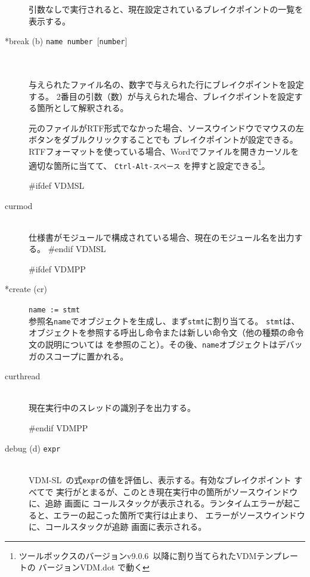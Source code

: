 \documentclass[\pformat,12pt]{article}
\newcommand{\vdmslpp}{VDM-SL}
\newcommand{\vdmslpp}{VDM++}
\newcommand{\vdmtoolsver}{v9.0.6}
\newcommand{\guicmd}[1]{{\sf #1}}
\newcommand{\guicmd}[1]{{\gt #1}}
\begin{document}
\begin{description}
  引数なしで実行されると、現在設定されているブレイクポイントの一覧を表示する。

\item[*break (b) \mbox{\texttt{name number} [\texttt{number}]}]\mbox{}\\
\mbox{}\\
 与えられたファイル名の、数字で与えられた行にブレイクポイントを設定する。
 2番目の引数（数）が与えられた場合、ブレイクポイントを設定する箇所として解釈される。

元のファイルがRTF形式でなかった場合、\guicmd{ソースウインドウ}でマウスの左ボタンをダブルクリックすることでも
ブレイクポイントが設定できる。
RTFフォーマットを使っている場合、Wordでファイルを開きカーソルを適切な箇所に当てて、
\texttt{Ctrl-Alt-スペース}%
を押すと設定できる\footnote{ツールボックスのバージョン\vdmtoolsver\ 以降に割り当てられたVDMテンプレートの
バージョンVDM.dot で動く}。 

#ifdef VDMSL
\item[curmod] \mbox{}\\
  仕様書がモジュールで構成されている場合、現在のモジュール名を出力する。
#endif VDMSL

#ifdef VDMPP
\item[*create (cr)] {\tt name := stmt}\mbox{}\\
  参照名{\tt name}でオブジェクトを生成し、まず{\tt stmt}に割り当てる。
  {\tt stmt}は、オブジェクトを参照する呼出し命令または新しい命令文（他の種類の命令文の説明については
  \cite{LangManPP-CSK}を参照のこと）。その後、{\tt name}オブジェクトはデバッガのスコープに置かれる。
  
\item[curthread]\mbox{}\\
  現在実行中のスレッドの識別子を出力する。
  
#endif VDMPP

\item[debug (d) {\tt expr}]  \mbox{}\\
  \vdmslpp\ の式{\tt expr}の値を評価し、表示する。有効なブレイクポイント すべてで
  実行がとまるが、このとき現在実行中の箇所が\guicmd{ソースウインドウ} に、\guicmd{追跡} 画面に
  コールスタックが表示される。ランタイムエラーが起こると、エラーの起こった箇所で実行は止まり、
  エラーが\guicmd{ソースウインドウ} に、コールスタックが\guicmd{追跡} 画面に表示される。
  

\end{description}
\end{document}
